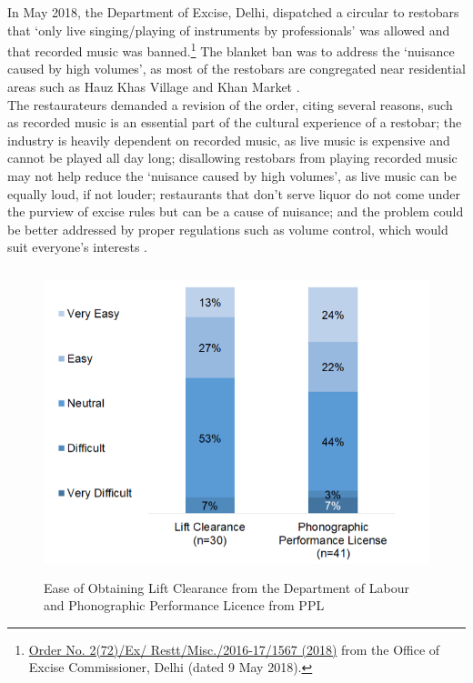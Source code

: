 \documentclass[a4paper, 12pt, twoside]{article}
\begin{document}
		In May 2018, the Department of Excise, Delhi, dispatched a circular to restobars that ‘only live singing/playing of instruments by professionals’ was allowed and that recorded music was banned.\footnote{\href{https://bit.ly/2MzCM02} {Order No. 2(72)/Ex/
Restt/Misc./2016-17/1567 (2018)} from the Office of Excise Commissioner, Delhi (dated 9 May 2018).} The blanket ban was to address the ‘nuisance caused by high volumes’, as most of the restobars are congregated near residential areas such as Hauz Khas 
Village and Khan Market \parencite{week2018delhirecordedmusicban}.\\
		
		The restaurateurs demanded a revision of the order, citing several reasons, such as recorded music is an essential part of the cultural experience of a restobar; the industry is heavily dependent on recorded music, as live music is expensive and cannot 
be played all day long; disallowing restobars from playing recorded music may not help reduce the ‘nuisance caused by high volumes’, as live music can be equally loud, if not louder; restaurants that don’t serve liquor do not come under the purview of excise rules 
but can be a cause of nuisance; and the problem could be better addressed by proper regulations such as volume control, which would suit everyone’s interests \parencite{week2018delhirecordedmusicban}.
		
		\begin{figure}[H]
                    	\centering
                    	\includegraphics[height = 3.5in]{Figure5.png}
                    	\captionsetup{justification=centering}\caption[Optional Caption]{Ease of Obtaining Lift Clearance from the Department of Labour and Phonographic Performance Licence from PPL}
		\end{figure}	
\end{document}
